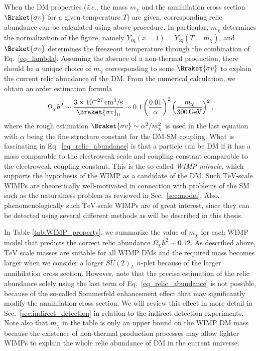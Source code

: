 \documentclass[12pt,twoside,book]{article}
\begin{document}
When the DM properties (\textit{i.e.}, the mass $m_\chi$ and the annihilation cross section $\Braket{\sigma v}$ for a given temperature $T$) are given, corresponding relic abundance can be calculated using above procedure.
In particular, $m_\chi$ determines the normalization of the figure, namely $Y_{\mathrm{eq}} (x=1) = Y_{\mathrm{eq}} (T=m_\chi)$, and $\Braket{\sigma v}$ determines the freezeout temperature through the combination of Eq.~\eqref{eq_lambda}.
Assuming the absence of a non-thermal production, there should be a unique choice of $m_\chi$ corresponding to some $\Braket{\sigma v}$ to explain the current relic abundance of the DM.
From the numerical calculation, we obtain an order estimation formula
\begin{align}
  \Omega_\chi h^2 \sim \frac{3 \times 10^{-27}\,\mathrm{cm^3}/\mathrm{s}}
  {\Braket{\sigma v}_0} \sim
  0.1 \left( \frac{0.01}{\alpha} \right)^2
  \left( \frac{m_\chi}{300\,\mathrm{GeV}} \right)^2,\label{eq_relic_abundance}
\end{align}
where the rough estimation $\Braket{\sigma v} \sim \alpha^2/m_\chi^2$ is used in the last equation with $\alpha$ being the fine structure constant for the DM-SM coupling.
What is fascinating in Eq.~\eqref{eq_relic_abundance} is that a particle can be DM if it has a mass comparable to the electroweak scale and coupling constant comparable to the electroweak coupling constant.
This is the so-called \textit{WIMP miracle}, which supports the hypothesis of the WIMP as a candidate of the DM.
Such $\mathrm{TeV}$-scale WIMPs are theoretically well-motivated in connection with problems of the SM such as the naturalness problem as reviewed in Sec.~\ref{sec:model}.
Also, phenomenologically such $\mathrm{TeV}$-scale WIMPs are of great interest, since they can be detected using several different methods as will be described in this thesis.

In Table \ref{tab:WIMP_property}, we summarize the value of $m_\chi$ for each WIMP model that predicts the correct relic abundance $\Omega_\chi h^2 \sim 0.12$.
As described above, $\mathrm{TeV}$ scale masses are suitable for all WIMP DMs and the required mass becomes larger when we consider a larger $SU(2)_L$ $n$-plet because of the larger annihilation cross section.
However, note that the precise estimation of the relic abundance solely using the last term of Eq.~\eqref{eq_relic_abundance} is not possible, because of the so-called Sommerfeld enhancement effect \cite{Hisano:2004ds,Hisano:2006nn} that may significantly modify the annihilation cross section.
We will review this effect in more detail in Sec.~\ref{sec:indirect_detection} in relation to the indirect detection experiments.
Note also that $m_\chi$ in the table is only an upper bound on the WIMP DM mass because the existence of non-thermal production processes may allow lighter WIMPs to explain the whole relic abundance of DM in the current universe.
\end{document}
